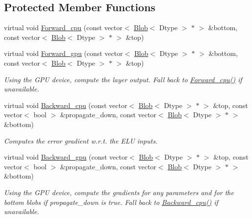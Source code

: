 \subsection*{Protected Member Functions}
\begin{DoxyCompactItemize}
\item 
virtual void \hyperlink{classcaffe_1_1ELULayer_a2699f747f8702f7c640c4a275b34fa58}{Forward\+\_\+cpu} (const vector$<$ \hyperlink{classcaffe_1_1Blob}{Blob}$<$ Dtype $>$ $\ast$ $>$ \&bottom, const vector$<$ \hyperlink{classcaffe_1_1Blob}{Blob}$<$ Dtype $>$ $\ast$ $>$ \&top)
\item 
virtual void \hyperlink{classcaffe_1_1ELULayer_a603dd731816bb2be5b88bff94140e0bb}{Forward\+\_\+gpu} (const vector$<$ \hyperlink{classcaffe_1_1Blob}{Blob}$<$ Dtype $>$ $\ast$ $>$ \&bottom, const vector$<$ \hyperlink{classcaffe_1_1Blob}{Blob}$<$ Dtype $>$ $\ast$ $>$ \&top)\hypertarget{classcaffe_1_1ELULayer_a603dd731816bb2be5b88bff94140e0bb}{}\label{classcaffe_1_1ELULayer_a603dd731816bb2be5b88bff94140e0bb}

\begin{DoxyCompactList}\small\item\em Using the G\+PU device, compute the layer output. Fall back to \hyperlink{classcaffe_1_1ELULayer_a2699f747f8702f7c640c4a275b34fa58}{Forward\+\_\+cpu()} if unavailable. \end{DoxyCompactList}\item 
virtual void \hyperlink{classcaffe_1_1ELULayer_ae6ec837971800a3dce6d72a984cec0c6}{Backward\+\_\+cpu} (const vector$<$ \hyperlink{classcaffe_1_1Blob}{Blob}$<$ Dtype $>$ $\ast$ $>$ \&top, const vector$<$ bool $>$ \&propagate\+\_\+down, const vector$<$ \hyperlink{classcaffe_1_1Blob}{Blob}$<$ Dtype $>$ $\ast$ $>$ \&bottom)
\begin{DoxyCompactList}\small\item\em Computes the error gradient w.\+r.\+t. the E\+LU inputs. \end{DoxyCompactList}\item 
virtual void \hyperlink{classcaffe_1_1ELULayer_a0e45de15c2ae6cfeda87733730ab57de}{Backward\+\_\+gpu} (const vector$<$ \hyperlink{classcaffe_1_1Blob}{Blob}$<$ Dtype $>$ $\ast$ $>$ \&top, const vector$<$ bool $>$ \&propagate\+\_\+down, const vector$<$ \hyperlink{classcaffe_1_1Blob}{Blob}$<$ Dtype $>$ $\ast$ $>$ \&bottom)\hypertarget{classcaffe_1_1ELULayer_a0e45de15c2ae6cfeda87733730ab57de}{}\label{classcaffe_1_1ELULayer_a0e45de15c2ae6cfeda87733730ab57de}

\begin{DoxyCompactList}\small\item\em Using the G\+PU device, compute the gradients for any parameters and for the bottom blobs if propagate\+\_\+down is true. Fall back to \hyperlink{classcaffe_1_1ELULayer_ae6ec837971800a3dce6d72a984cec0c6}{Backward\+\_\+cpu()} if unavailable. \end{DoxyCompactList}\end{DoxyCompactItemize}
